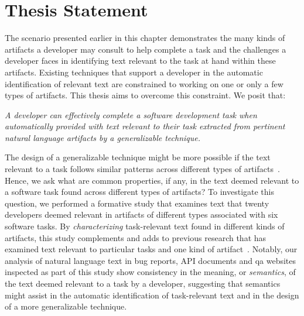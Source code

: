 

\section{Thesis Statement}
\label{cp1:thesis}





The scenario presented earlier in this chapter demonstrates
the
 many kinds of 
artifacts a developer may consult to help complete
 a task and the challenges a developer faces in identifying text relevant to the task at hand  within these 
artifacts.
Existing techniques that support a developer
in the automatic identification of relevant
text are constrained to working on one or only a 
few types of artifacts. This thesis aims to
overcome this constraint. We posit that:

\bigskip
\begin{bluequote}
    \textit{A developer can effectively complete a software development task when automatically provided with text relevant to their task extracted from pertinent natural language artifacts
    by a generalizable technique.}
\end{bluequote}
\medskip



The design of a generalizable technique might be
more possible if the text relevant to
a task follows similar patterns
 across different types of artifacts~\cite{Kintsch1978a}.
Hence, we ask what are common properties, if any, in the text deemed relevant 
to a software task  found across different types of artifacts?
To investigate this question, we performed a formative study that 
examines  text that twenty developers deemed relevant in artifacts 
of different types associated with six software tasks.
By \textit{characterizing} task-relevant text found in different kinds of artifacts,
this study complements and adds to previous research that has
examined text relevant to particular tasks and one kind of artifact~\cite{Ko2006, Rastkar2010, Chaparro2017, Robillard2015}.
Notably, our analysis of natural language text  in bug
reports, API documents and \ac{qa} websites 
inspected as part of this study 
 show consistency in the meaning, or \textit{semantics}, of the
 text deemed relevant to a task by a developer, suggesting that 
semantics might assist in the automatic identification of
task-relevant text and in the design of a more generalizable technique.




